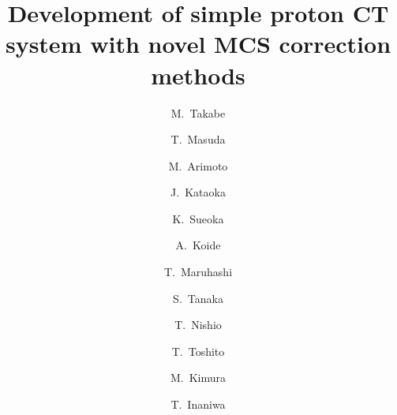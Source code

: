 \documentclass[preprint,3pt]{elsarticle} %
\begin{document}
\begin{frontmatter}



\title{Development of simple proton CT system with novel MCS correction methods}


\author[waseda]{M.~Takabe}
\author[waseda,TWMU]{T.~Masuda}
\author[waseda]{M.~Arimoto}
\author[waseda]{J.~Kataoka}
\author[waseda]{K.~Sueoka}
\author[waseda]{A.~Koide}
\author[waseda]{T.~Maruhashi}
\author[Tokyo]{S.~Tanaka}
\author[TWMU]{T.~Nishio}
\author[NPTT]{T.~Toshito}
\author[NPTT]{M.~Kimura}
\author[QST]{T.~Inaniwa}

\address[waseda]{Waseda University, Graduate School of Advanced Science and Engineering, 3-4-1 Okubo, Shinjuku, Tokyo, Japan}
\address[Tokyo]{The University of Tokyo, 2-11-16 Yayoi, Bunkyo-ku, Tokyo, Japan}
\address[TWMU]{Tokyo Women’s Medical University, 8-1, Kawadacho, Shinjuku-ku, Tokyo, Japan}
\address[NPTT]{Nagoya Proton Therapy Center, 1-1-1, Hirate-cho, Kita-ku, Nagoya, Japan}
\address[QST]{National Institute of Radiological Sciences, 4-9-1 Anagawa, Inage-ku, Chiba-shi, Chiba, Japan}


\end{frontmatter}
\end{document}
